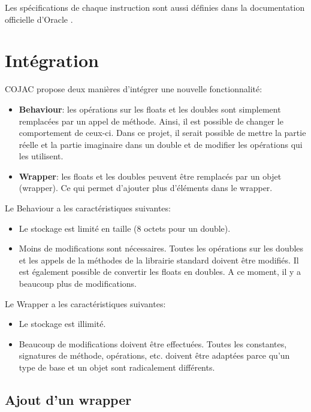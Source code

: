 Les spécifications de chaque instruction sont aussi définies dans la documentation officielle d'Oracle \cite{java-bytecode-documentation}.

\section{Intégration}
\label{sec:cojac_integration}

\gls{COJAC} propose deux manières d'intégrer une nouvelle fonctionnalité:

\begin{itemize}
    \item \textbf{\Gls{Behaviour}}: les opérations sur les floats et les doubles sont simplement remplacées par un appel de méthode. Ainsi, il est possible de changer le comportement de ceux-ci. Dans ce projet, il serait possible de mettre la partie réelle et la partie imaginaire dans un double et de modifier les opérations qui les utilisent.
    \item \textbf{Wrapper}: les floats et les doubles peuvent être remplacés par un objet (wrapper). Ce qui permet d'ajouter plus d'éléments dans le wrapper.
\end{itemize}

Le \gls{Behaviour} a les caractéristiques suivantes:

\begin{itemize}
    \item Le stockage est limité en taille (8 octets pour un double).
    \item Moins de modifications sont nécessaires. Toutes les opérations sur les doubles et les appels de la méthodes de la librairie standard doivent être modifiés. Il est également possible de convertir les floats en doubles. A ce moment, il y a beaucoup plus de modifications.
\end{itemize}

Le \gls{Wrapper} a les caractéristiques suivantes:

\begin{itemize}
    \item Le stockage est illimité.
    \item Beaucoup de modifications doivent être effectuées. Toutes les constantes, signatures de méthode, opérations, etc. doivent être adaptées parce qu'un type de base et un objet sont radicalement différents.
\end{itemize}

\subsection{Ajout d'un wrapper}


